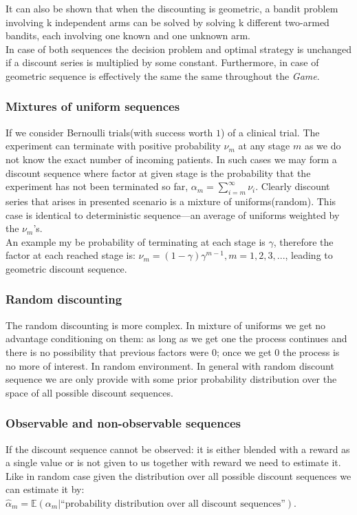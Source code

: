 \documentclass[12pt, a4paper, pdflatex, leqno]{report}
\begin{document}
It can also be shown that when the discounting is geometric, a bandit problem involving k independent arms can be solved by solving k different two-armed bandits, each involving one known and one unknown arm.\\[3cm]



In case of both sequences the decision problem and optimal strategy is unchanged if a discount series is multiplied by some constant. Furthermore, in case of geometric sequence is effectively the same the same throughout the \emph{Game}.


\subsubsection{Mixtures of uniform sequences}
If we consider Bernoulli trials(with success worth $1$) of a clinical trial. The experiment can terminate with positive probability $\nu_m$ at any stage $m$ as we do not know the exact number of incoming patients. In such cases we may form a discount sequence where factor at given stage is the probability that the experiment has not been terminated so far, $\alpha_m = \sum_{i=m}^\infty \nu_i$. Clearly discount series that arises in presented scenario is a mixture of uniforms(random). This case is identical to deterministic sequence---an average of uniforms weighted by the $\nu_m$'s.\\
An example my be probability of terminating at each stage is $\gamma$, therefore the factor at each reached stage is: $\nu_m = (1-\gamma)\gamma^{m-1}, m=1,2,3,...$, leading to geometric discount sequence.

\subsubsection{Random discounting}
The random discounting is more complex. In mixture of uniforms we get no advantage conditioning on them: as long as we get one the process continues and there is no possibility that previous factors were $0$; once we get $0$ the process is no more of interest. In random environment. In general with random discount sequence we are only provide with some prior probability distribution over the space of all possible discount sequences.\\

\subsubsection{Observable and non-observable sequences}
If the discount sequence cannot be observed: it is either blended with a reward as a single value or is not given to us together with reward we need to estimate it. Like in random case given the distribution over all possible discount sequences we can estimate it by: $\hat{\alpha}_m = \mathbb{E}(\alpha_m | \text{``probability distribution over all discount sequences''})$.\\
\end{document}
